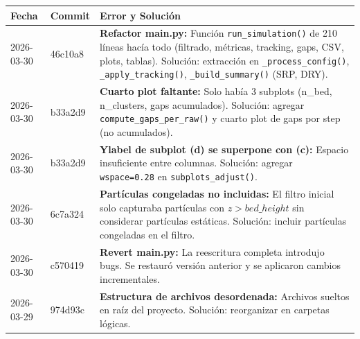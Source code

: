 \documentclass[12pt,a4paper]{article}
\begin{document}
\begin{table}[H]
	\centering
	\begin{tabular}{@{}llp{9cm}@{}}
		\toprule
		\textbf{Fecha} & \textbf{Commit} & \textbf{Error y Solución}                                                                                                                                                                                                                                                    \\
		\midrule
		2026-03-30     & 46c10a8         & \textbf{Refactor main.py:} Función \texttt{run\_simulation()} de 210 líneas hacía todo (filtrado, métricas, tracking, gaps, CSV, plots, tablas). Solución: extracción en \texttt{\_process\_config()}, \texttt{\_apply\_tracking()}, \texttt{\_build\_summary()} (SRP, DRY). \\
		2026-03-30     & b33a2d9         & \textbf{Cuarto plot faltante:} Solo había 3 subplots (n\_bed, n\_clusters, gaps acumulados). Solución: agregar \texttt{compute\_gaps\_per\_raw()} y cuarto plot de gaps por step (no acumulados).                                                                            \\
		2026-03-30     & b33a2d9         & \textbf{Ylabel de subplot (d) se superpone con (c):} Espacio insuficiente entre columnas. Solución: agregar \texttt{wspace=0.28} en \texttt{subplots\_adjust()}.                                                                                                             \\
		2026-03-30     & 6c7a324         & \textbf{Partículas congeladas no incluidas:} El filtro inicial solo capturaba partículas con $z > bed\_height$ sin considerar partículas estáticas. Solución: incluir partículas congeladas en el filtro.                                                                    \\
		2026-03-30     & c570419         & \textbf{Revert main.py:} La reescritura completa introdujo bugs. Se restauró versión anterior y se aplicaron cambios incrementales.                                                                                                                                          \\
		2026-03-29     & 974d93c         & \textbf{Estructura de archivos desordenada:} Archivos sueltos en raíz del proyecto. Solución: reorganizar en carpetas lógicas.                                                                                                                                               \\
		\bottomrule
	\end{tabular}
\end{table}
\end{document}
